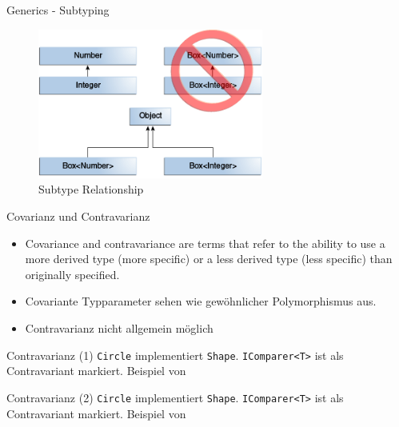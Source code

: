\documentclass[11pt]{beamer}
\begin{document}
\begin{frame}{Generics - Subtyping}
	\begin{figure}
			\includegraphics[width=0.66\textwidth]{bilder/generics-subtypeRelationship.png}
			\caption{Subtype Relationship \cite{java_generics_inheritance}}
	\end{figure}
\end{frame}

\begin{frame}{Covarianz und Contravarianz}
	\begin{itemize}
		\item \glqq Covariance and contravariance are terms that refer to the ability to use a more derived type (more specific) or a less derived type (less specific) than originally specified.\grqq{} \cite{csharp_docs_variance}
		\item Covariante Typparameter  sehen wie \glqq gewöhnlicher\grqq{} Polymorphismus aus.
		\item Contravarianz nicht allgemein möglich
	\end{itemize}

\end{frame}

\begin{frame}{Contravarianz (1)}
\tiny{
\texttt{Circle} implementiert \texttt{Shape}. \texttt{IComparer<T>} ist als Contravariant markiert.}
Beispiel von \cite{csharp_example_contravariance}
\end{frame}

\begin{frame}{Contravarianz (2)}
\tiny{
\texttt{Circle} implementiert \texttt{Shape}. \texttt{IComparer<T>} ist als Contravariant markiert.}
Beispiel von \cite{csharp_example_contravariance}
\end{frame}
\end{document}
